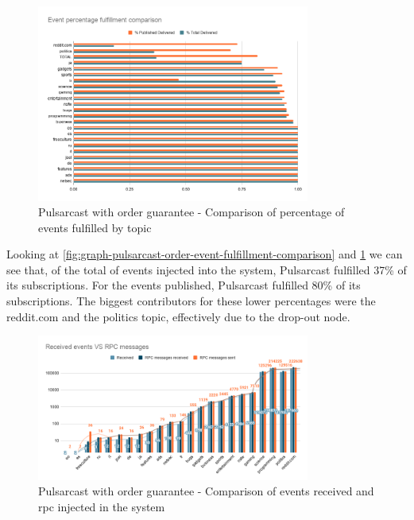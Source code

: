 \begin{figure}[!htb]
  \centering
  \includegraphics[width=0.8\textwidth]{img/graph-pulsarcast-order-event-percentage-fulfillment-comparison.png}
  \caption{Pulsarcast with order guarantee - Comparison of percentage of events fulfilled by topic}
  \label{fig:graph-pulsarcast-order-event-percentage-fulfillment-comparison}
\end{figure}

Looking at \ref{fig:graph-pulsarcast-order-event-fulfillment-comparison} and
\ref{fig:graph-pulsarcast-order-event-percentage-fulfillment-comparison} we can
see that, of the total of events injected into the system, Pulsarcast fulfilled
37\% of its subscriptions. For the events published, Pulsarcast fulfilled 80\%
of its subscriptions. The biggest contributors for these lower percentages were
the reddit.com and the politics topic, effectively due to the drop-out node.

\begin{figure}[!htb]
  \centering
  \includegraphics[width=0.8\textwidth]{img/graph-pulsarcast-order-rpc.png}
  \caption{Pulsarcast with order guarantee - Comparison of events received and \acrshort{rpc} injected in the system}
  \label{fig:graph-pulsarcast-order-rpc}
\end{figure}

